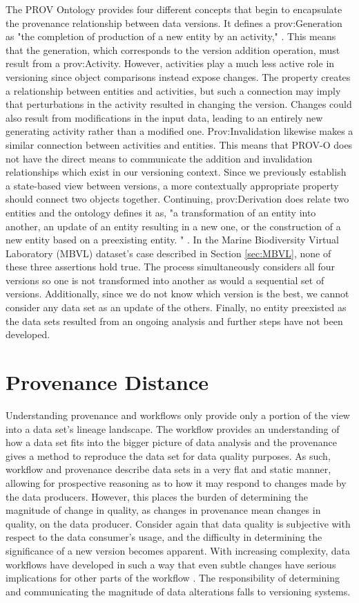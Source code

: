 The PROV Ontology provides four different concepts that begin to encapsulate the provenance relationship between data versions.
It defines a prov:Generation as "the completion of production of a new entity by an activity," \cite{Lebo2013}.
This means that the generation, which corresponds to the version addition operation, must result from a prov:Activity.
However, activities play a much less active role in versioning since object comparisons instead expose changes.
The property creates a relationship between entities and activities, but such a connection may imply that perturbations in the activity resulted in changing the version.
Changes could also result from modifications in the input data, leading to an entirely new generating activity rather than a modified one.
Prov:Invalidation likewise makes a similar connection between activities and entities.
This means that PROV-O does not have the direct means to communicate the addition and invalidation relationships which exist in our versioning context.
Since we previously establish a state-based view between versions, a more contextually appropriate property should connect two objects together.
Continuing, prov:Derivation does relate two entities and the ontology defines it as, "a transformation of an entity into another, an update of an entity resulting in a new one, or the construction of a new entity based on a preexisting entity. " \cite{Lebo2013}.
In the Marine Biodiversity Virtual Laboratory (MBVL) dataset's case described in Section \ref{sec:MBVL}, none of these three assertions hold true. 
The process simultaneously considers all four versions so one is not transformed into another as would a sequential set of versions.
Additionally, since we do not know which version is the best, we cannot consider any data set as an update of the others.
Finally, no entity preexisted as the data sets resulted from an ongoing analysis and further steps have not been developed.

\section{Provenance Distance}

Understanding provenance and workflows only provide only a portion of the view into a data set's lineage landscape.
The workflow provides an understanding of how a data set fits into the bigger picture of data analysis and the provenance gives a method to reproduce the data set for data quality purposes.
As such, workflow and provenance describe data sets in a very flat and static manner, allowing for prospective reasoning as to how it may respond to changes made by the data producers.
However, this places the burden of determining the magnitude of change in quality, as changes in provenance mean changes in quality, on the data producer.
Consider again that data quality is subjective with respect to the data consumer's usage, and the difficulty in determining the significance of a new version becomes apparent.
With increasing complexity, data workflows have developed in such a way that even subtle changes have serious implications for other parts of the workflow \cite{TILMES2011548}.
The responsibility of determining and communicating the magnitude of data alterations falls to versioning systems.

